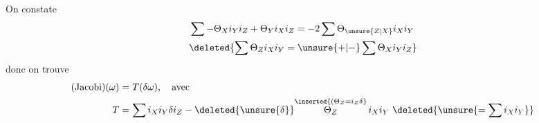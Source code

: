 On constate 
\[
\begin{aligned}
&\sum-\Theta_X i_Y i_Z+\Theta_Y i_X i_Z=-2\sum\Theta_{\unsure{Z|X}}i_X i_Y\\
&\deleted{\sum\Theta_Z i_X i_Y=\unsure{+|-}\sum\Theta_X i_Y i_Z}
\end{aligned}
\]
donc on trouve
\[
\begin{aligned}
(\text{Jacobi})(\omega)&=T(\delta\omega),\quad\text{avec}\\
T&=\sum i_X i_Y\delta i_Z-\deleted{\unsure{\delta}}\overset{\inserted{(\Theta_Z=i_Z\delta}}{\Theta_Z}\,i_X i_Y\ \deleted{\unsure{=\sum i_X i_Y}}
\end{aligned}
\]


